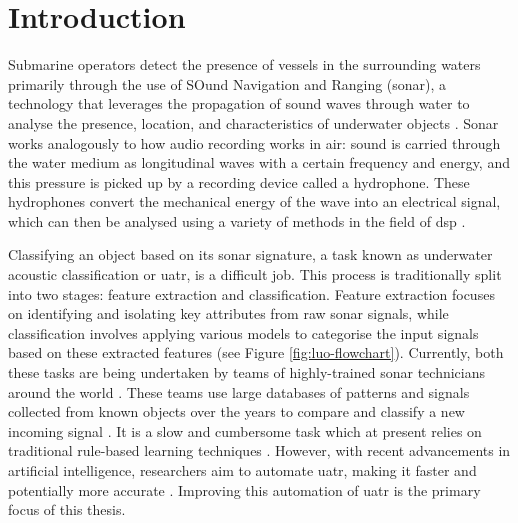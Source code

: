\chapter{Introduction}

Submarine operators detect the presence of vessels in the surrounding waters primarily through the use of SOund Navigation and Ranging (sonar), a technology that leverages the propagation of sound waves through water to analyse the presence, location, and characteristics of underwater objects \cite{niu_advances_2023}. Sonar works analogously to how audio recording works in air: sound is carried through the water medium as longitudinal waves with a certain frequency and energy, and this pressure is picked up by a recording device called a hydrophone. These hydrophones convert the mechanical energy of the wave into an electrical signal, which can then be analysed using a variety of methods in the field of \acrfull{dsp} \cite{waite_sonar_2002, domingos_survey_2022}.

Classifying an object based on its sonar signature, a task known as underwater acoustic classification or \acrfull{uatr}, is a difficult job. This process is traditionally split into two stages: feature extraction and classification. Feature extraction focuses on identifying and isolating key attributes from raw sonar signals, while classification involves applying various models to categorise the input signals based on these extracted features (see Figure \ref{fig:luo-flowchart}). Currently, both these tasks are being undertaken by teams of highly-trained sonar technicians around the world \cite{aslam_underwater_2024}. These teams use large databases of patterns and signals collected from known objects over the years to compare and classify a new incoming signal \cite{niu_advances_2023}. It is a slow and cumbersome task which at present relies on traditional rule-based learning techniques \cite{neupane_review_2020}.  However, with recent advancements in artificial intelligence, researchers aim to automate \acrshort{uatr}, making it faster and potentially more accurate \cite{aslam_underwater_2024, neupane_review_2020}. Improving this automation of \acrshort{uatr} is the primary focus of this thesis.

